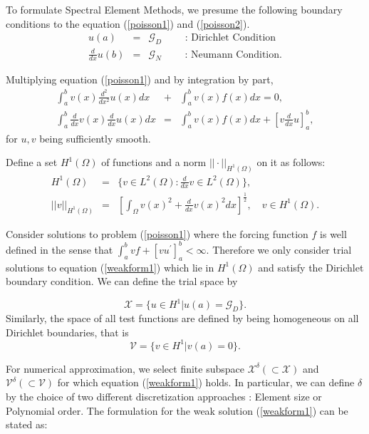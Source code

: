 
To formulate Spectral Element Methods, we presume the following boundary conditions to the equation (\ref{poisson1}) and (\ref{poisson2}).
\begin{eqnarray}\label{bdycond}
    u(a) &=& {\mathcal G}_D \qquad \mbox{ : Dirichlet Condition}\\
    \frac{d}{dx}u(b) &=& \mathcal{G}_N \qquad \mbox{ : Neumann Condition}.
\end{eqnarray}

Multiplying equation (\ref{poisson1}) and by integration by part,
\begin{eqnarray}
\int_a^b v(x)\frac{d^2}{dx^2}u(x) dx &+& \int_a^b v(x) f(x) dx = 0,\\
\label{weakform1}
\int_a^b \frac{d}{dx}v(x)\frac{d}{dx}u(x)dx &=& \int_a^b v(x) f(x) dx + \left[v \frac{d}{dx}u\right]_a^b,
\end{eqnarray}
for $u, v$ being sufficiently smooth.

Define a set $H^1(\Omega)$ of functions and a norm $||\cdot||_{H^1(\Omega)}$ on it as follows:
\begin{eqnarray}
H^1(\Omega) &=& \{v \in L^2(\Omega) : \frac{d}{dx}v \in L^2(\Omega)\}, \\
||v ||_{H^1(\Omega)} &=& \left[ \int_{\Omega}v(x)^2 + \frac{d}{dx}v(x)^2 dx \right]^{\frac{1}{2}}, \quad v \in H^1(\Omega).
\end{eqnarray}

Consider solutions to problem (\ref{poisson1}) where the forcing function $f$ is well defined in the sense that
$\int_a^b v f + \left[ v u^{\prime} \right]_a^b < \infty$. Therefore we only consider trial solutions to equation (\ref{weakform1}) which lie in $H^1(\Omega)$ and satisfy the Dirichlet boundary condition. We can define the trial space by

\begin{equation}
\mathcal{X} = \{u\in H^1|u(a) = {\mathcal G}_D\}.
\end{equation}
Similarly, the space of all test functions are defined by being homogeneous on all Dirichlet boundaries, that is
\begin{equation}
\mathcal{V} = \{v\in H^1|v(a) = 0\}.
\end{equation}

For numerical approximation, we select finite subspace $\mathcal{X}^{\delta} (\subset \mathcal{X})$ and $\mathcal{V}^{\delta} (\subset \mathcal{V})$ for which equation (\ref{weakform1}) holds. In particular, we can define $\delta$ by the choice of two different discretization approaches : Element size or Polynomial order. The formulation for the weak solution (\ref{weakform1}) can be stated as:

